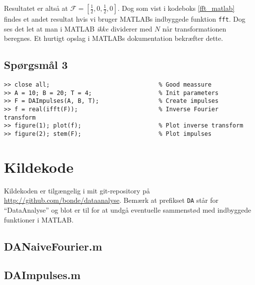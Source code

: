 \documentclass[a4paper, 10pt, danish, final]{article}
\def\repository{\url{http://github.com/bonde/dataanalyse}}
\begin{document}
Resultatet er altså at $\mathcal{F} = [\frac{1}{2}, 0, \frac{1}{2}, 0]$.
Dog som vist i kodeboks \ref{fft_matlab} findes et andet resultat hvis
vi bruger MATLABs indbyggede funktion \texttt{fft}. Dog ses det let at
man i MATLAB \emph{ikke} dividerer med $N$ når transformationen
beregnes. Et hurtigt opslag i MATLABs dokumentation bekræfter dette.

\subsection*{Spørgsmål 3}

\begin{lstlisting}[caption={Invers Fouriertransformation i MATLAB og
    (kommandoprompt)}, captionpos=b,
    label={ifft_matlab}, float=t]
>> close all;                               % Good meassure
>> A = 10; B = 20; T = 4;                   % Init parameters
>> F = DAImpulses(A, B, T);                 % Create impulses
>> f = real(ifft(F));                       % Inverse Fourier transform
>> figure(1); plot(f);                      % Plot inverse transform
>> figure(2); stem(F);                      % Plot impulses

\end{lstlisting}






\appendix
\lstset{language=Matlab, basicstyle=\scriptsize,
    showstringspaces=false, numbers=left, stepnumber=1,
    numberstyle=\tiny, frame=none}
\section{Kildekode}
Kildekoden er tilgængelig i mit git-repository på \repository{}. Bemærk
at prefikset \texttt{DA} står for ``DataAnalyse'' og blot er til for at
undgå eventuelle sammenstød med indbyggede funktioner i MATLAB.

\subsection{DANaiveFourier.m}


\subsection{DAImpulses.m}

\end{document}
